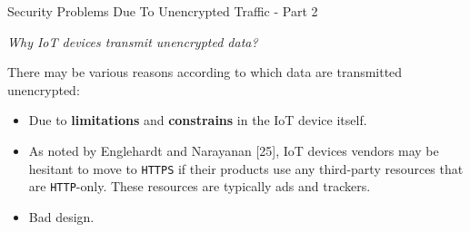 \documentclass[10pt]{beamer}
\begin{document}
\begin{frame}{Security Problems Due To Unencrypted Traffic - Part 2}

\begin{alertblock}{}
\textit{Why IoT devices transmit unencrypted data?}
\end{alertblock}

There may be various reasons according to which data are transmitted unencrypted:

\begin{itemize}
\justifying

\item Due to \textbf{limitations} and \textbf{constrains} in the IoT device itself. 

\item As noted by Englehardt and Narayanan [25], IoT devices vendors may be hesitant to move to \texttt{HTTPS} if their products use any third-party resources that are \texttt{HTTP}-only. These resources are typically ads and trackers.

\item Bad design.

\end{itemize}


\end{frame} 
\end{document}
